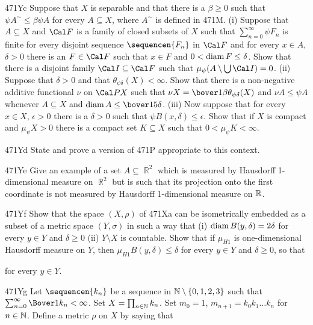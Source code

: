 {\spheader 471Yc Suppose that $X$ is separable and that there is a
$\beta\ge 0$ such that
$\psi A^{\sim}\le\beta\psi A$ for every $A\subseteq X$, where
$A^{\sim}$ is defined in 471M.   (i) Suppose that $A\subseteq X$ and
$\Cal F$ is a family of closed subsets of $X$ such that
$\sum_{n=0}^{\infty}\psi F_n$ is finite for every disjoint sequence
$\sequencen{F_n}$ in $\Cal F$ and for every $x\in A$, $\delta>0$ there
is an $F\in\Cal F$ such that $x\in F$ and $0<\mathop{\text{diam}} F\le\delta$.   Show
that there is a disjoint family $\Cal I\subseteq\Cal F$ such that
$\mu_{\psi}(A\setminus\bigcup\Cal I)=0$.   (ii) Suppose that $\delta>0$
and that $\theta_{\psi\delta}(X)<\infty$.   Show that there is a
non-negative additive functional $\nu$ on $\Cal PX$ such that
$\nu X=\bover1{\beta}\theta_{\psi\delta}(X)$ and $\nu A\le\psi A$
whenever $A\subseteq X$ and $\diam A\le\bover15\delta$.
(iii) Now suppose that for every $x\in X$, $\epsilon>0$ there is a
$\delta>0$ such that $\psi B(x,\delta)\le\epsilon$.
Show that if $X$ is compact and $\mu_{\psi}X>0$ there is a
compact set $K\subseteq X$ such that $0<\mu_{\psi}K<\infty$.

\spheader 471Yd State and prove a version of 471P appropriate to this
context.

\spheader 471Ye Give an example of a set $A\subseteq\BbbR^2$ which is
measured by Hausdorff 1-dimensional measure on $\BbbR^2$ but is such
that its projection onto the first coordinate is not measured by
Hausdorff 1-dimensional measure on $\Bbb R$.

\spheader 471Yf Show that the space $(X,\rho)$ of 471Xa can be
isometrically embedded
as a subset of a metric space $(Y,\sigma)$ in such a way that (i)
$\mathop{\text{diam}} B(y,\delta)=2\delta$ for every $y\in Y$ and $\delta\ge 0$ (ii)
$Y\setminus X$ is countable.   Show that if $\mu_{H1}$ is
one-dimensional Hausdorff measure on $Y$, then
$\mu_{H1}B(y,\delta)\le\delta$ for every $y\in Y$ and $\delta\ge 0$, so
that


\noindent for every $y\in Y$.

\spheader 471Yg Let $\sequencen{k_n}$ be a sequence in
$\Bbb N\setminus \{0,1,2,3\}$ such that
$\sum_{n=0}^{\infty}\Bover1{k_n}<\infty$.   Set
$X=\prod_{n\in\Bbb N}k_n$.
Set $m_0=1$, $m_{n+1}=k_0k_1\ldots k_n$ for
$n\in\Bbb N$.   Define a metric $\rho$ on $X$ by saying that

}
